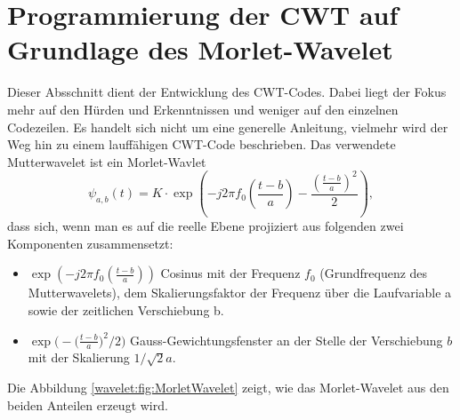 %
%
%
%
\section{Programmierung der CWT auf Grundlage des Morlet-Wavelet 
\label{wavelets:section:teil2}}

Dieser Absschnitt dient der Entwicklung des CWT-Codes.
Dabei liegt der Fokus mehr auf den Hürden und Erkenntnissen und
weniger auf den einzelnen Codezeilen.
Es handelt sich nicht um eine generelle Anleitung, vielmehr wird
der Weg hin zu einem lauffähigen CWT-Code beschrieben.
Das verwendete Mutterwavelet ist ein Morlet-Wavlet \cite{wavelets:Wikipedia}
\begin{equation}
	\psi_{a,b}(t)=K\cdot\exp\left(-j2\pi f_0\left(\frac{t-b}{a}\right)-\frac{\left(\frac{t-b}{a}\right)^2}{2}\right),
	\label{wavelets:equation6}
\end{equation}
dass sich, wenn man es auf die reelle Ebene projiziert aus folgenden
zwei Komponenten zusammensetzt:

\begin{itemize}
	\item $\exp\left(-j2\pi f_0\left(\frac{t-b}{a}\right)\right)$
	Cosinus mit der Frequenz $f_0$ (Grundfrequenz des
	Mutterwavelets), dem Skalierungsfaktor der Frequenz über
	die Laufvariable a sowie der zeitlichen Verschiebung b.
	\item $\exp\bigl(-\bigl(\frac{t-b}{a}\bigr)^2/2\bigr)$
	Gauss-Gewichtungsfenster an der Stelle der Verschiebung $b$
	mit der Skalierung $1/\!\sqrt{2}a$.
\end{itemize}
Die Abbildung \ref{wavelet:fig:MorletWavelet} zeigt, wie das
Morlet-Wavelet aus den beiden Anteilen erzeugt wird.

